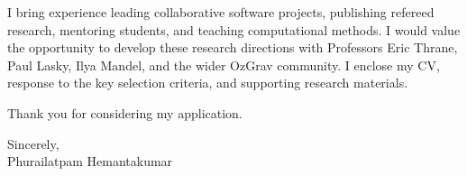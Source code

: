 \documentclass[11pt]{article}
\begin{document}
I bring experience leading collaborative software projects, publishing refereed research, mentoring students, and teaching computational methods. I would value the opportunity to develop these research directions with Professors Eric Thrane, Paul Lasky, Ilya Mandel, and the wider OzGrav community. I enclose my CV, response to the key selection criteria, and supporting research materials.

Thank you for considering my application.

Sincerely,\\
Phurailatpam Hemantakumar
\end{document}
